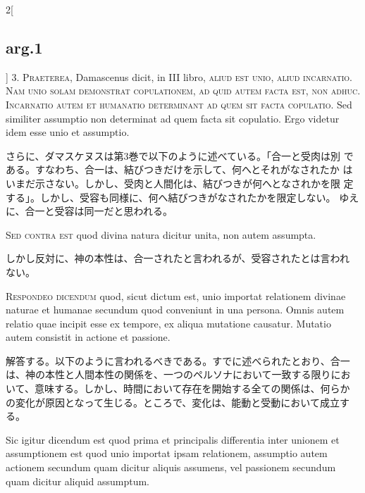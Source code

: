 \documentclass[paper=a4paper,fontsize=10pt,jafontsize=9pt,titlepage]{jlreq}
\begin{document}
\begin{paracol}{2}[\subsection{arg.1}]
3. {\scshape Praeterea}, Damascenus dicit, in III libro, {\scshape
aliud est unio, aliud incarnatio. Nam unio solam demonstrat
copulationem, ad quid autem facta est, non adhuc. Incarnatio autem et
humanatio determinant ad quem sit facta copulatio}. Sed similiter
assumptio non determinat ad quem facta sit copulatio. Ergo videtur
idem esse unio et assumptio.

\switchcolumn

さらに、ダマスケヌスは第3巻で以下のように述べている。「合一と受肉は別
である。すなわち、合一は、結びつきだけを示して、何へとそれがなされたか
はいまだ示さない。しかし、受肉と人間化は、結びつきが何へとなされかを限
定する」。しかし、受容も同様に、何へ結びつきがなされたかを限定しない。
ゆえに、合一と受容は同一だと思われる。

\switchcolumn*[\subsection{s.c.}]

{\scshape Sed contra est} quod divina natura dicitur unita, non autem
assumpta.

\switchcolumn

しかし反対に、神の本性は、合一されたと言われるが、受容されたとは言われ
ない。


{\scshape Respondeo dicendum} quod, sicut dictum est, unio importat
relationem divinae naturae et humanae secundum quod conveniunt in una
persona. Omnis autem relatio quae incipit esse ex tempore, ex aliqua
mutatione causatur. Mutatio autem consistit in actione et passione.

\switchcolumn

解答する。以下のように言われるべきである。すでに述べられたとおり、合一
は、神の本性と人間本性の関係を、一つのペルソナにおいて一致する限りにお
いて、意味する。しかし、時間において存在を開始する全ての関係は、何らか
の変化が原因となって生じる。ところで、変化は、能動と受動において成立す
る。

\switchcolumn*

Sic igitur dicendum est quod prima et principalis differentia inter
unionem et assumptionem est quod unio importat ipsam relationem,
assumptio autem actionem secundum quam dicitur aliquis assumens, vel
passionem secundum quam dicitur aliquid assumptum.


\end{paracol}
\end{document}
